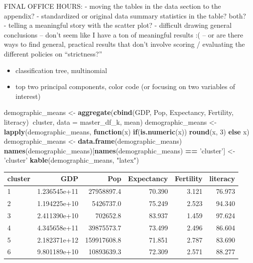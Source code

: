 \documentclass[]{article}
\newenvironment{Shaded}{\begin{snugshade}}{\end{snugshade}}
\newcommand{\ControlFlowTok}[1]{\textcolor[rgb]{0.13,0.29,0.53}{\textbf{#1}}}
\newcommand{\DataTypeTok}[1]{\textcolor[rgb]{0.13,0.29,0.53}{#1}}
\newcommand{\DecValTok}[1]{\textcolor[rgb]{0.00,0.00,0.81}{#1}}
\newcommand{\KeywordTok}[1]{\textcolor[rgb]{0.13,0.29,0.53}{\textbf{#1}}}
\newcommand{\NormalTok}[1]{#1}
\newcommand{\OperatorTok}[1]{\textcolor[rgb]{0.81,0.36,0.00}{\textbf{#1}}}
\newcommand{\StringTok}[1]{\textcolor[rgb]{0.31,0.60,0.02}{#1}}
\providecommand{\tightlist}{%
  \setlength{\itemsep}{0pt}\setlength{\parskip}{0pt}}
\begin{document}
FINAL OFFICE HOURS: - moving the tables in the data section to the
appendix? - standardized or original data summary statistics in the
table? both? - telling a meaningful story with the scatter plot? -
difficult drawing general conclusions -- don't seem like I have a ton of
meaningful results :( -- or are there ways to find general, practical
results that don't involve scoring / evaluating the different policies
on ``strictness?''

\begin{itemize}
\tightlist
\item
  classification tree, multinomial
\item
  top two principal components, color code (or focusing on two variables
  of interest)
\end{itemize}

\begin{Shaded}
\begin{Highlighting}[]
\NormalTok{demographic_means <-}\StringTok{ }\KeywordTok{aggregate}\NormalTok{(}\KeywordTok{cbind}\NormalTok{(GDP, Pop, Expectancy, Fertility, literacy)}\OperatorTok{~}\NormalTok{cluster, }
                               \DataTypeTok{data =}\NormalTok{ master_df_k, mean)}
\NormalTok{demographic_means <-}\StringTok{ }\KeywordTok{lapply}\NormalTok{(demographic_means, }\ControlFlowTok{function}\NormalTok{(x) }\ControlFlowTok{if}\NormalTok{(}\KeywordTok{is.numeric}\NormalTok{(x)) }\KeywordTok{round}\NormalTok{(x, }\DecValTok{3}\NormalTok{) }\ControlFlowTok{else}\NormalTok{ x)}
\NormalTok{demographic_means <-}\StringTok{ }\KeywordTok{data.frame}\NormalTok{(demographic_means)}
\KeywordTok{names}\NormalTok{(demographic_means)[}\KeywordTok{names}\NormalTok{(demographic_means) }\OperatorTok{==}\StringTok{ 'cluster'}\NormalTok{] <-}\StringTok{ 'cluster'}
\KeywordTok{kable}\NormalTok{(demographic_means, }\StringTok{"latex"}\NormalTok{)}
\end{Highlighting}
\end{Shaded}

\begin{tabular}{l|r|r|r|r|r}
\hline
cluster & GDP & Pop & Expectancy & Fertility & literacy\\
\hline
1 & 1.236545e+11 & 27958897.4 & 70.390 & 3.121 & 76.973\\
\hline
2 & 1.194225e+10 & 5426737.0 & 75.249 & 2.523 & 94.340\\
\hline
3 & 2.411390e+10 & 702652.8 & 83.937 & 1.459 & 97.624\\
\hline
4 & 4.345658e+11 & 39875573.7 & 73.499 & 2.496 & 86.604\\
\hline
5 & 2.182371e+12 & 159917608.8 & 71.851 & 2.787 & 83.690\\
\hline
6 & 9.801189e+10 & 10893639.3 & 72.309 & 2.571 & 88.277\\
\hline
\end{tabular}
\end{document}
